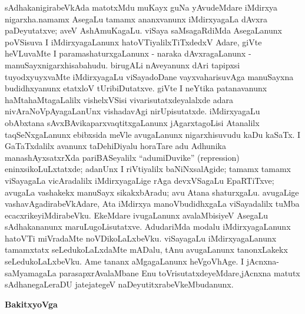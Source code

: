 sAdhakanigirabeVkAda matotxMdu muKayx guNa yAvudeMdare iMdirxya nigarxha.\break namamx AsegaLu tamamx ananxvanunx iMdirxyagaLa dAvxra paDeyutatxve; aveV AshAmuKagaLu. viSaya saMsagaRdiMda AsegaLanunx poVSisuva I iMdirxyagaLanunx hatoVTiyalilx\-TiTxdedxV Adare, giVte heVLuvaMte I paramashaturxgaLanunx - naraka dAvxragaLanunx - manuSayx\break nigarxhisabahudu. birugALi nAveyanunx dAri tapipxsi tuyodxyuyxvaMte iMdirxya\-gaLu viSayadoDane vayxvaharisuvAga manuSayxna budidhxyanunx etatxloV tUribiDutatxve. giVte I neYtika patanavanunx haMtahaMtagaLalilx vishelxVSisi vivarisutatxdeyalalxde adara nivAraNoV\-pAyagaLanUnx vishadavAgi nirUpisutatxde. iMdirxyagaLu obAbxtana sAvxBAvika\break  parxvaqtitxgaLanunx jAgarxtagoLisi Atanalilx taqSeNxgaLanunx ebibxsida meVle avugaLanunx nigarxhisu\-vudu kaDu kaSaTx. I GaTaTxdalilx avanunx taDehiDiyalu horaTare adu Adhunika mana\-shAyxsatxrXda pariBASeyalilx ``adumiDuvike'' {\rm (repression)} eninxsikoLuLxtatxde; \hbox{adanUnx} I riVtiyalilx baNiNxsalAgide; tamamx tamamx viSayagaLa vicAradalilx iMdirxyagaLige rAga devxVSagaLu EpaRTiTxve; avugaLa vashakekx manuSayx sikakxbAradu; avu Atana shaturxgaLu. avugaLige vashavAgadirabeVkAdare, Ata iMdirxya manoVbudidhxgaLa viSayadalilx tuMba ecacxrikeyiMdirabeVku. EkeMdare ivugaLanunx avalaMbisiyeV AsegaLu sAdhakananunx maruLugoLisutatxve. AdudariMda modalu iMdirxyagaLanunx hatoVTi miVradaMte noVDikoLaLxbeVku. viSayagaLu iMdirxyagaLanunx tamamxtatx seLedukoLaLxdaMte mADalu, tAnu avugaLanunx tanonxLakekx seLedukoLaLxbeVku. Ame tananx aMgagaLanunx heVgoV\break hAge. I jAcnxna-saMyamagaLa parasapxrAvalaMbane Enu toVrisutatxdeyeMdare,\break jAcnxna matutx sAdhanegaLeraDU jatejategeV naDeyutitxrabeVkeMbudanunx.

\begin{center}
\textbf{\Large{BakitxyoVga}}
\end{center}

